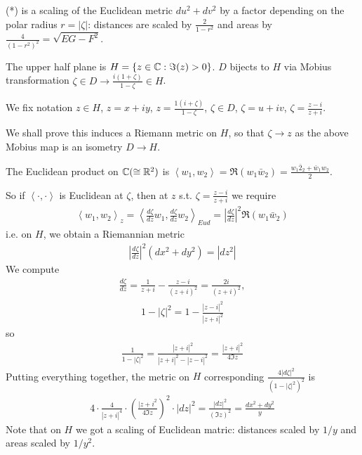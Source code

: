 \documentclass[a4paper]{article}
\begin{document}
(*) is a scaling of the Euclidean metric $du^2+dv^2$ by a factor depending on the polar radius $r=|\zeta|$: distances are scaled by $\frac{2}{1-r^2}$ and areas by $\frac{4}{(1-r^2)^2} = \sqrt{EG-F^2}$.

The upper half plane is $H = \{z \in \mathbb{C}: \Im(z) > 0\}$. $D$ bijects to $H$ via M$\ddot{o}$bius transformation $\zeta \in D \to \frac{i(1+\zeta)}{1-\zeta} \in H$.

We fix notation $z \in H$, $z=x+iy$, $z = \frac{1(i+\zeta)}{1-\zeta}$, $\zeta \in D$, $\zeta = u+iv$, $\zeta = \frac{z-i}{z+i}$.

We shall prove this induces a Riemann metric on $H$, so that $\zeta \to z$ as the above M$\ddot{o}$bius map is an isometry $D \to H$.

The Euclidean product on $\mathbb{C}(\cong \mathbb{R}^2)$ is $\left<w_1,w_2\right> = \Re(w_1\bar{w}_2) = \frac{w_1\bar{2}_2+\bar{w}_1w_2}{2}$.

So if $\left<\cdot,\cdot\right>$ is Euclidean at $\zeta$, then at $z$ s.t. $\zeta = \frac{z-i}{z+i}$ we require
\begin{equation*}
\begin{aligned}
\left<w_1,w_2\right>_z = \left<\frac{d\zeta}{dz}w_1,\frac{d\zeta}{dz} w_2\right>_{Eud} = \left|\frac{d\zeta}{dz}\right|^2 \Re(w_1\bar{w}_2)
\end{aligned}
\end{equation*}
i.e. on $H$, we obtain a Riemannian metric
\begin{equation*}
\begin{aligned}
\left|\frac{d\zeta}{dz}\right|^2 (dx^2+dy^2) = |dz^2|
\end{aligned}
\end{equation*}
We compute
\begin{equation*}
\begin{aligned}
\frac{d\zeta}{dz} = \frac{1}{z+i} - \frac{z-i}{(z+i)^2} = \frac{2i}{(z+i)^2},
\end{aligned}
\end{equation*}
\begin{equation*}
\begin{aligned}
1-|\zeta|^2 = 1-\frac{|z-i|^2}{|z+i|^2}
\end{aligned}
\end{equation*}
so
\begin{equation*}
\begin{aligned}
\frac{1}{1-|\zeta|^2} = \frac{|z+i|^2}{|z+i|^2-|z-i|^2} = \frac{|z+i|^2}{4\Im z}
\end{aligned}
\end{equation*}
Putting everything together, the metric on $H$ corresponding $\frac{4|d\zeta|^2}{(1-|\zeta|^2)^2}$ is
\begin{equation*}
\begin{aligned}
4 \cdot \frac{4}{|z+i|^4} \cdot \left(\frac{|z+i^2}{4\Im z}\right)^2 \cdot |dz|^2 = \frac{|dz|^2}{(\Im z)^2} = \frac{dx^2 + dy^2}{y}
\end{aligned}
\end{equation*}
Note that on $H$ we got a scaling of Euclidean matric: distances scaled by $1/y$ and areas scaled by $1/y^2$.
\end{document}
